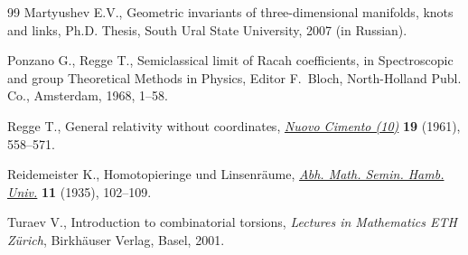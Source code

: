 \documentclass[pdftex]{sigma}
\begin{document}
\begin{thebibliography}{99}
Martyushev E.V.,
Geometric invariants of three-dimensional manifolds, knots and links, Ph.D. Thesis, South Ural State University, 2007 (in Russian).

Ponzano G., Regge T.,
Semiclassical limit of Racah coef\/f\/icients,
in Spectroscopic and group Theoretical Methods in Physics, Editor F.~Bloch,
North-Holland Publ. Co., Amsterdam, 1968, 1--58.

Regge T.,
General relativity without coordinates,
\href{http://dx.doi.org/10.1007/BF02733251}{{\it Nuovo Cimento (10)}} {\bf 19} (1961), 558--571.

Reidemeister K.,
Homotopieringe und Linsenr\"aume,
\href{http://dx.doi.org/10.1007/BF02940717}{{\it Abh. Math. Semin. Hamb. Univ.}} {\bf 11} (1935), 102--109.


Turaev V.,
Introduction to combinatorial torsions, {\it Lectures in Mathematics ETH Z\"urich}, Birkh\"auser Verlag, Basel, 2001.

\end{thebibliography}\LastPageEnding
\end{document}
